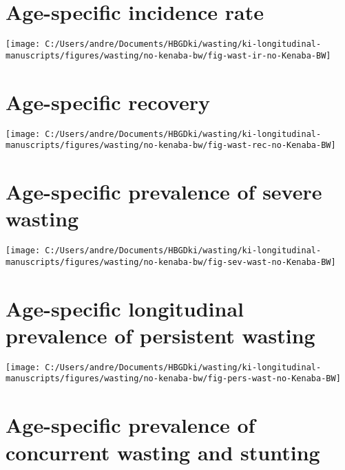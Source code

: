 \documentclass[
  9pt,
]{book}
\begin{document}
\hypertarget{age-specific-incidence-rate-1}{%
\section{Age-specific incidence rate}\label{age-specific-incidence-rate-1}}

\texttt{[image: C:/Users/andre/Documents/HBGDki/wasting/ki-longitudinal-manuscripts/figures/wasting/no-kenaba-bw/fig-wast-ir-no-Kenaba-BW]}

\hypertarget{age-specific-recovery-1}{%
\section{Age-specific recovery}\label{age-specific-recovery-1}}

\texttt{[image: C:/Users/andre/Documents/HBGDki/wasting/ki-longitudinal-manuscripts/figures/wasting/no-kenaba-bw/fig-wast-rec-no-Kenaba-BW]}

\hypertarget{age-specific-prevalence-of-severe-wasting-2}{%
\section{Age-specific prevalence of severe wasting}\label{age-specific-prevalence-of-severe-wasting-2}}

\texttt{[image: C:/Users/andre/Documents/HBGDki/wasting/ki-longitudinal-manuscripts/figures/wasting/no-kenaba-bw/fig-sev-wast-no-Kenaba-BW]}

\hypertarget{age-specific-longitudinal-prevalence-of-persistent-wasting-2}{%
\section{Age-specific longitudinal prevalence of persistent wasting}\label{age-specific-longitudinal-prevalence-of-persistent-wasting-2}}

\texttt{[image: C:/Users/andre/Documents/HBGDki/wasting/ki-longitudinal-manuscripts/figures/wasting/no-kenaba-bw/fig-pers-wast-no-Kenaba-BW]}

\hypertarget{age-specific-prevalence-of-concurrent-wasting-and-stunting-2}{%
\section{Age-specific prevalence of concurrent wasting and stunting}\label{age-specific-prevalence-of-concurrent-wasting-and-stunting-2}}
\end{document}

